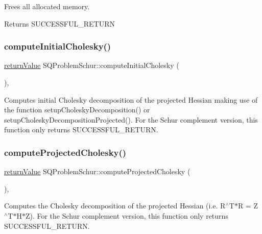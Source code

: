 Frees all allocated memory. \begin{DoxyReturn}{Returns}
S\+U\+C\+C\+E\+S\+S\+F\+U\+L\+\_\+\+R\+E\+T\+U\+RN 
\end{DoxyReturn}
\mbox{\label{class_s_q_problem_schur_aa14dbff1ae7aed776437a4b34f6cc062}} 
\subsubsection{\texorpdfstring{compute\+Initial\+Cholesky()}{computeInitialCholesky()}}
{\footnotesize\ttfamily \hyperlink{_message_handling_8hpp_a81d556f613bfbabd0b1f9488c0fa865e}{return\+Value} S\+Q\+Problem\+Schur\+::compute\+Initial\+Cholesky (\begin{DoxyParamCaption}{ }\end{DoxyParamCaption})\hspace{0.3cm}{\ttfamily [protected]}, {\ttfamily [virtual]}}

Computes initial Cholesky decomposition of the projected Hessian making use of the function setup\+Cholesky\+Decomposition() or setup\+Cholesky\+Decomposition\+Projected(). For the Schur complement version, this function only returns S\+U\+C\+C\+E\+S\+S\+F\+U\+L\+\_\+\+R\+E\+T\+U\+RN. \mbox{\label{class_s_q_problem_schur_aa98408881b63d7bd758df680603a1bb9}} 
\subsubsection{\texorpdfstring{compute\+Projected\+Cholesky()}{computeProjectedCholesky()}}
{\footnotesize\ttfamily \hyperlink{_message_handling_8hpp_a81d556f613bfbabd0b1f9488c0fa865e}{return\+Value} S\+Q\+Problem\+Schur\+::compute\+Projected\+Cholesky (\begin{DoxyParamCaption}{ }\end{DoxyParamCaption})\hspace{0.3cm}{\ttfamily [protected]}, {\ttfamily [virtual]}}

Computes the Cholesky decomposition of the projected Hessian (i.\+e. R$^\wedge$\+T$\ast$R = Z$^\wedge$\+T$\ast$\+H$\ast$Z). For the Schur complement version, this function only returns S\+U\+C\+C\+E\+S\+S\+F\+U\+L\+\_\+\+R\+E\+T\+U\+RN. 

